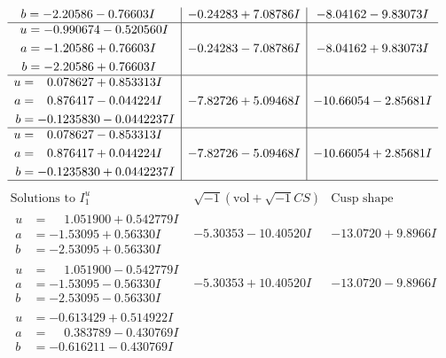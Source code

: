 \documentclass[1p]{elsarticle_modified}
\theoremstyle{definition}
\newcommand{\I}{\sqrt{-1}}
\begin{document}
$$\begin{array}{c|c|c}
\begin{aligned}
b &= -2.20586 - 0.76603 I\end{aligned}
 & -0.24283 + 7.08786 I & -8.04162 - 9.83073 I \\ \hline\begin{aligned}
u &= -0.990674 - 0.520560 I \\
a &= -1.20586 + 0.76603 I \\
b &= -2.20586 + 0.76603 I\end{aligned}
 & -0.24283 - 7.08786 I & -8.04162 + 9.83073 I \\ \hline\begin{aligned}
u &= \phantom{-}0.078627 + 0.853313 I \\
a &= \phantom{-}0.876417 - 0.044224 I \\
b &= -0.1235830 - 0.0442237 I\end{aligned}
 & -7.82726 + 5.09468 I & -10.66054 - 2.85681 I \\ \hline\begin{aligned}
u &= \phantom{-}0.078627 - 0.853313 I \\
a &= \phantom{-}0.876417 + 0.044224 I \\
b &= -0.1235830 + 0.0442237 I\end{aligned}
 & -7.82726 - 5.09468 I & -10.66054 + 2.85681 I\\
 \hline 
 \end{array}$$\newpage$$\begin{array}{c|c|c}  
\text{Solutions to }I^u_{1}& \I (\text{vol} + \sqrt{-1}CS) & \text{Cusp shape}\\
 \hline 
\begin{aligned}
u &= \phantom{-}1.051900 + 0.542779 I \\
a &= -1.53095 + 0.56330 I \\
b &= -2.53095 + 0.56330 I\end{aligned}
 & -5.30353 - 10.40520 I & -13.0720 + 9.8966 I \\ \hline\begin{aligned}
u &= \phantom{-}1.051900 - 0.542779 I \\
a &= -1.53095 - 0.56330 I \\
b &= -2.53095 - 0.56330 I\end{aligned}
 & -5.30353 + 10.40520 I & -13.0720 - 9.8966 I \\ \hline\begin{aligned}
u &= -0.613429 + 0.514922 I \\
a &= \phantom{-}0.383789 - 0.430769 I \\
b &= -0.616211 - 0.430769 I\end{aligned}

\end{array}$$
\end{document}
